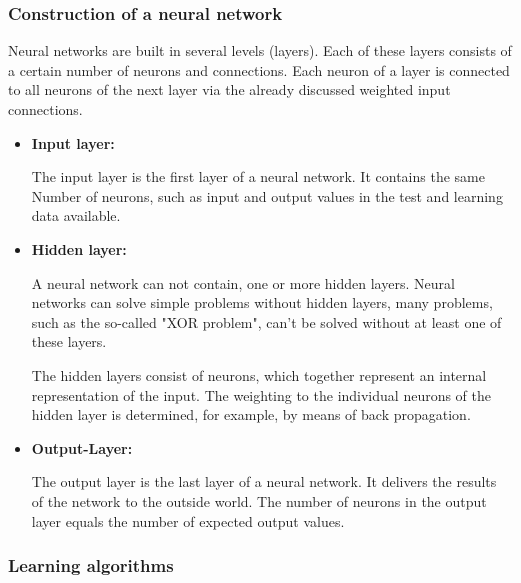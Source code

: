 \subsubsection{Construction of a neural network}



Neural networks are built in several levels (layers). Each
of these layers consists of a certain number of neurons and
connections. Each neuron of a layer is connected to all
neurons of the next layer via the already discussed
weighted input connections.

\begin{itemize}

  \item \textbf{Input layer:}

        The input layer is the first layer of a neural
        network. It contains the same Number of neurons,
        such as input and output values in the test and
        learning data available.

  \item \textbf{Hidden layer:}

        A neural network can not contain, one or more
        hidden layers. Neural networks can solve simple
        problems without hidden layers, many problems, such
        as the so-called "XOR problem", can't be solved
        without at least one of these layers.\cite{nne_beck}

        The hidden layers consist of neurons, which
        together represent an internal representation of
        the input. The weighting to the individual neurons
        of the hidden layer is determined, for example, by
        means of back propagation.

  \item \textbf{Output-Layer:}

        The output layer is the last layer of a neural
        network. It delivers the results of the network to
        the outside world. The number of neurons in the
        output layer equals the number of expected output
        values.

\end{itemize}

\subsubsection{Learning algorithms}

